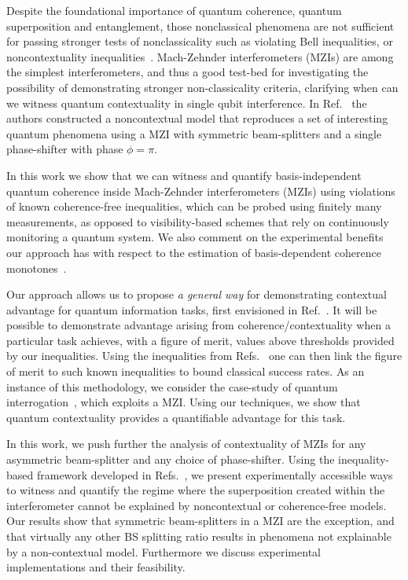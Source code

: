 \documentclass[a4paper,twocolumn,11pt,accepted=2024-01-17]{quantumarticle}
\begin{document}
Despite the foundational importance of quantum coherence, quantum superposition and entanglement, those nonclassical phenomena are not sufficient for passing stronger tests of nonclassicality such as violating Bell inequalities, or noncontextuality inequalities~\cite{werner1989quantum,spekkens2007evidence,hardy1999disentangling}. {Mach-Zehnder interferometers (MZIs)} are among the simplest interferometers, and thus a good test-bed for investigating the possibility of demonstrating stronger non-classicality criteria, clarifying when can we witness quantum contextuality in single qubit interference. In Ref.~\cite{catani2021interference} the authors constructed a noncontextual model that reproduces a set of interesting quantum phenomena using a MZI with symmetric beam-splitters and a single phase-shifter with phase $\phi = \pi$. 

In this work we show that we can witness and quantify basis-independent quantum coherence inside Mach-Zehnder interferometers (MZIs) using violations of known coherence-free inequalities, which can be probed using finitely many measurements, as opposed to visibility-based schemes that { rely} on continuously monitoring a quantum system. We also comment on the experimental benefits our approach has with respect to the estimation of basis-dependent coherence monotones~\cite{Streltsov17}.

Our approach allows us to propose \textit{a general way} for demonstrating contextual advantage for quantum information tasks, first envisioned in Ref.~\cite{Lostaglio2020contextualadvantage}. It will be possible to demonstrate advantage arising from coherence/contextuality when a particular task achieves, with a figure of merit, values above thresholds provided by our inequalities.  {Using the inequalities from Refs.~\cite{galvaobroad2020quantumandclassical,wagner2022inequalities} one can then link the figure of merit to such known inequalities to bound classical success rates. }As an instance of this methodology, we consider the case-study of quantum interrogation~\cite{elitzur1993quantum,vaidman1996interaction,kwiat1995interactionfree,kwiat1999high,rudolph2000better}, which exploits a MZI. Using our techniques, we show that quantum contextuality provides a quantifiable advantage for this task. 

{In this work, }we push further the analysis of contextuality of MZIs for any asymmetric beam-splitter and any choice of phase-shifter. {Using the inequality-based framework developed in  Refs.~\cite{galvaobroad2020quantumandclassical,wagner2022inequalities}}, we present experimentally accessible ways to witness and quantify the regime where the superposition created within the interferometer cannot be explained by noncontextual or coherence-free models. Our results show that symmetric beam-splitters in a MZI are the exception, and that virtually any other BS splitting ratio results in phenomena not explainable by a non-contextual model. Furthermore we discuss experimental implementations and their feasibility. 
\end{document}
